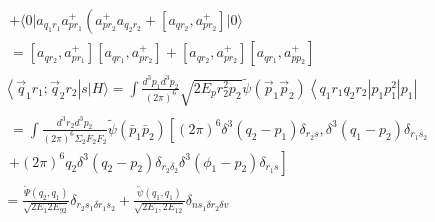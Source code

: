 \documentclass[10pt]{article}
\begin{document}
\[\begin{aligned}
& \begin{array}{l}
+\langle 0| a_{q_{1} r_{1}} a_{p r_{1}}^{+}\left(a_{p r_{2}}^{+} a_{q_{2} r_{2}}+\left[a_{q r_{2}}, a_{p r_{2}}^{+}\right]|0\rangle\right. \\
=\left[a_{q r_{2}}, a_{p r_{1}}^{+}\right]\left[a_{q r_{1}}, a_{p r_{2}}^{+}\right]+\left[a_{q r_{2}}, a_{p r_{2}}^{+}\right]\left[a_{q r_{1}}, a_{p p_{2}}^{+}\right]
\end{array} \\
& \left\langle\vec{q}_{1} r_{1} ; \vec{q}_{2} r_{2}\right| s|H\rangle=\int \frac{d^{3} p_{1} d^{3} p_{2}}{(2 \pi)^{6}} \sqrt{2 E_{p} r_{2}^{2} p_{2}} \tilde{\psi}\left(\vec{p}_{1} \vec{p}_{2}\right)\left\langle q_{1} r_{1} q_{2} r_{2}\right| p_{1} p_{1}^{2}\left|p_{1}\right| \\
& \begin{array}{r}
=\int \frac{d^{3} r_{2} d^{3} p_{2}}{(2 \pi)^{6} \Sigma_{2} F_{2} F_{2}} \tilde{\psi}\left(\bar{p}_{1} \bar{p}_{2}\right)\left[(2 \pi)^{6} \delta^{3}\left(q_{2}-p_{1}\right) \delta_{r_{2} s}, \delta^{3}\left(q_{1}-p_{2}\right) \delta_{r_{1} s_{2}}\right. \\
\left.+(2 \pi)^{6} q_{2} \delta^{3}\left(q_{2}-p_{2}\right) \delta_{r_{2} \delta_{2}} \delta^{3}\left(\phi_{1}-p_{2}\right) \delta_{r_{1} s}\right]
\end{array} \\
& =\frac{\tilde{\Psi}\left(q_{2}, q_{1}\right)}{\sqrt{2 E_{1} 2 E_{92}}} \delta_{r_{2} s_{1} \delta r_{1} s_{2}}+\frac{\tilde{\psi}\left(q_{1}, q_{1}\right)}{\sqrt{2 E_{1}, 2 E_{12}}} \delta_{n s_{1} \delta r_{2} \delta v}
\end{aligned}
\]
\end{document}
